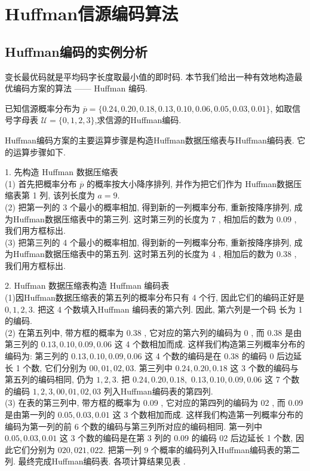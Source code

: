 \section{Huffman信源编码算法}
\subsection{Huffman编码的实例分析}
变长最优码就是平均码字长度取最小值的即时码. 本节我们给出一种有效地构造最优编码方案的算法 —— Huffman 编码.

\begin{example}
    已知信源概率分布为 $ \overline{p}=\{0.24,0.20,0.18,0.13,0.10,0.06,0.05,0.03,0.01\} $, 如取信号字母表 $ \mathscr{U}=\{0,1,2,3\} $,求信源的Huffman编码.
\end{example}

Huffman编码方案的主要运算步骤是构造Huffman数据压缩表与Huffman编码表. 它的运算步骤如下.

1. 先构造 Huffman 数据压缩表\\
(1) 首先把概率分布 $ \overline{p} $ 的概率按大小降序排列, 并作为把它们作为 Huffman数据压缩表第 1 列, 该列长度为 $ a=9 $.\\
(2) 把第一列的 3 个最小的概率相加, 得到新的一列概率分布, 重新按降序排列, 成为Huffman数据压缩表中的第三列. 这时第三列的长度为 7 , 相加后的数为 0.09 , 我们用方框标出.\\
(3) 把第三列的 4 个最小的概率相加, 得到新的一列概率分布, 重新按降序排列, 成为Huffman数据压缩表中的第五列. 这时第五列的长度为 4 , 相加后的数为 0.38 , 我们用方框标出.

2. Huffman 数据压缩表构造 Huffman 编码表\\
(1)因Huffman数据压缩表的第五列的概率分布只有 4 个行, 因此它们的编码正好是 $ 0,1,2,3 $. 把这 4 个数填入Huffman 编码表的第六列. 因此, 第六列是一个码
长为 1 的编码.\\
(2) 在第五列中, 带方框的概率为 0.38 , 它对应的第六列的编码为 0 , 而 0.38 是由第三列的 $ 0.13,0.10,0.09,0.06 $ 这 4 个数相加而成. 这样我们构造第三列概率分布的编码为: 第三列的 $ 0.13,0.10,0.09,0.06 $ 这 4 个数的编码是在 0.38 的编码 0 后边延长 1 个数, 它们分别为 $ 00,01,02,03 $. 第三列中 $ 0.24,0.20,0.18 $ 这 3 个数的编码与第五列的编码相同, 仍为 $ 1,2,3 $. 把 $ 0.24,0.20,0.18,$ $0.13,0.10,0.09,0.06 $ 这 7 个数的编码 $ 1,2,3,00,01,02,03 $ 列入Huffman编码表的第四列.\\
(3) 在表的第三列中, 带方框的概率为 0.09 , 它对应的第四列的编码为 02 , 而 0.09 是由第一列的 $ 0.05,0.03,0.01 $ 这 3 个数相加而成. 这样我们构造第一列概率分布的编码为第一列的前 6 个数的编码与第三列所对应的编码相同. 第一列中 $ 0.05,0.03,0.01 $ 这 3 个数的编码是在第 3 列的 0.09 的编码 02 后边延长 1 个数, 因此它们分别为 $ 020,021,022 $. 把第一列 9 个概率的编码列入Huffman编码表的第二列. 最终完成Huffman编码表. 各项计算结果见表 .

